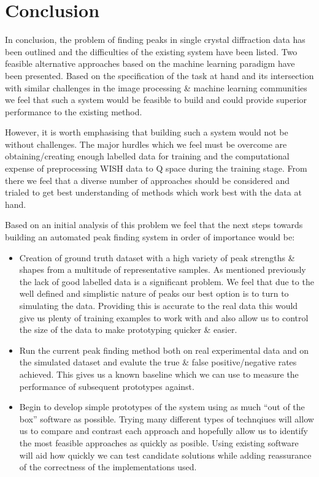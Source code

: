 \documentclass[paper=a4, fontsize=8pt]{scrartcl} \usepackage[T1]{fontenc}
\begin{document}
\section{Conclusion}
In conclusion, the problem of finding peaks in single crystal diffraction data 
has been outlined and the difficulties of the existing system have been listed.
Two feasible alternative approaches based on the machine learning paradigm have 
been presented. Based on the specification of the task at hand and its intersection
with similar challenges in the image processing \& machine learning communities
we feel that such a system would be feasible to build and could provide 
superior performance to the existing method. 

However, it is worth emphasising that building such a system would not be without 
challenges. The major hurdles which we feel must be overcome are obtaining/creating 
enough labelled data for training and the computational expense of preprocessing 
WISH data to Q space during the training stage. From there we feel that a diverse
number of approaches should be considered and trialed to get best understanding
of methods which work best with the data at hand.

Based on an initial analysis of this problem we feel that the next steps towards 
building an automated peak finding system in order of importance would be:

\begin{itemize}

\item Creation of ground truth dataset with a high variety of peak strengths \& shapes 
    from a multitude of representative samples. As mentioned previously the lack of good labelled
    data is a significant problem. We feel that due to the well defined and simplistic nature of 
    peaks our best option is to turn to simulating the data. Providing this is accurate to the 
    real data this would give us plenty of training examples to work with and also allow us
    to control the size of the data to make prototyping quicker \& easier.

\item Run the current peak finding method both on real experimental data and 
    on the simulated dataset and evalute the true \& false positive/negative rates achieved.
    This gives us a known baseline which we can use to measure the performance of subsequent
    prototypes against.

\item Begin to develop simple prototypes of the system using as much ``out of the box'' software
    as possible. Trying many different types of technqiues will allow us to compare and contrast
    each approach and hopefully allow us to identify the most feasible approaches as quickly as
    posible. Using existing software will aid how quickly we can test candidate solutions
    while adding reassurance of the correctness of the implementations used.

\end{itemize}
\end{document}
